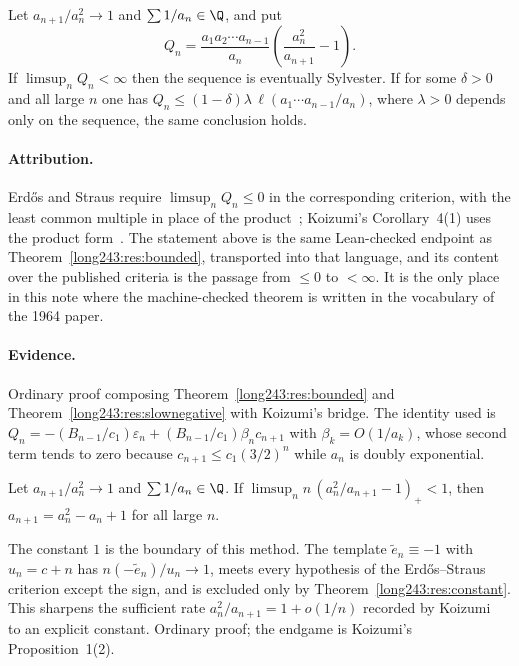 \documentclass[11pt]{article}
\begin{document}
\begin{theorem}\label{long243:res:strausbounded}
Let $a_{n+1}/a_n^2\to1$ and $\sum1/a_n\in\Q$, and put
\[
 Q_n=\frac{a_1a_2\cdots a_{n-1}}{a_n}
     \left(\frac{a_n^2}{a_{n+1}}-1\right).
\]
If $\limsup_nQ_n<\infty$ then the sequence is eventually Sylvester.  If for
some $\delta>0$ and all large $n$ one has
$Q_n\le(1-\delta)\lambda\,\ell(a_1\cdots a_{n-1}/a_n)$, where $\lambda>0$
depends only on the sequence, the same conclusion holds.
\end{theorem}

\paragraph{Attribution.}
Erd\H{o}s and Straus require $\limsup_nQ_n\le0$ in the corresponding criterion,
with the least common multiple in place of the product~\cite[Theorem~3,
p.~132]{erdosstraus1964}; Koizumi's Corollary~4(1) uses the product
form~\cite[Cor.~4(1), pp.~14--15]{koizumi2025}.  The statement above is the same
Lean-checked endpoint as Theorem~\ref{long243:res:bounded}, transported into that
language, and its content over the published criteria is the passage from
$\le0$ to $<\infty$.  It is the only place in this note where the machine-checked
theorem is written in the vocabulary of the 1964 paper.

\paragraph{Evidence.}
Ordinary proof composing Theorem~\ref{long243:res:bounded} and
Theorem~\ref{long243:res:slownegative} with Koizumi's bridge.  The identity used is
$Q_n=-(B_{n-1}/c_1)\varepsilon_n+(B_{n-1}/c_1)\beta_nc_{n+1}$ with
$\beta_k=O(1/a_k)$, whose second term tends to zero because $c_{n+1}\le
c_1(3/2)^n$ while $a_n$ is doubly exponential.

\begin{theorem}\label{long243:res:onethreshold}
Let $a_{n+1}/a_n^2\to1$ and $\sum1/a_n\in\Q$.  If
$\limsup_n n\,(a_n^2/a_{n+1}-1)_+<1$, then $a_{n+1}=a_n^2-a_n+1$ for all large
$n$.
\end{theorem}

\noindent The constant $1$ is the boundary of this method.  The template
$\tilde e_n\equiv-1$ with $u_n=c+n$ has $n(-\tilde e_n)/u_n\to1$, meets
every hypothesis of the Erd\H{o}s--Straus criterion except the sign, and is
excluded only by Theorem~\ref{long243:res:constant}.  This sharpens the sufficient rate
$a_n^2/a_{n+1}=1+o(1/n)$ recorded by Koizumi~\cite[Remark~3, p.~16]{koizumi2025} to an explicit constant.  Ordinary proof; the endgame is
Koizumi's Proposition~1(2).
\end{document}
